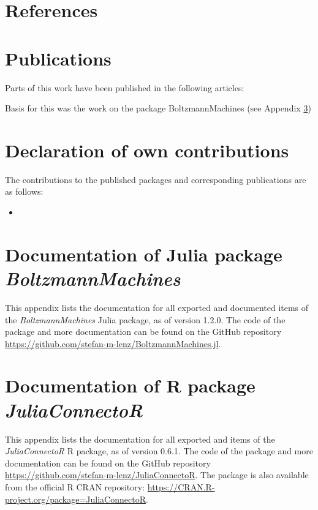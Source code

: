 \documentclass[12pt]{article}
\newcommand{\apkg}[1]{\emph{#1}}
\begin{document}
\begin{appendices}
\singlespacing
\section{References}

\renewcommand{\bibsection}{} %



\clearpage
\onehalfspacing
\section{Publications}
Parts of this work have been published in the following articles:


Basis for this was the work on the package BoltzmannMachines (see Appendix \ref{declcontr})

\section{Declaration of own contributions}\label{declcontr}

The contributions to the published packages and corresponding publications are as follows:

\begin{itemize}
\item 
\end{itemize}

\setlength{\emergencystretch}{3em}


\clearpage
\section[Documentation of Julia package \apkg{BoltzmannMachines}]{Documentation of Julia package \\ \apkg{BoltzmannMachines}}

This appendix lists the documentation for all exported and documented items of the \apkg{BoltzmannMachines} Julia package, as of version 1.2.0. The code of the package and more documentation can be found on the GitHub repository \url{https://github.com/stefan-m-lenz/BoltzmannMachines.jl}.


\clearpage
\section[Documentation of R package \apkg{JuliaConnectoR}]{Documentation of R package \\ \apkg{JuliaConnectoR}}
This appendix lists the documentation for all exported and items of the \apkg{JuliaConnectoR} R package, as of version 0.6.1. The code of the package and more documentation can be found on the GitHub repository \url{https://github.com/stefan-m-lenz/JuliaConnectoR}. The package is also available from the official R CRAN repository: \url{https://CRAN.R-project.org/package=JuliaConnectoR}.


\end{appendices}
\end{document}
